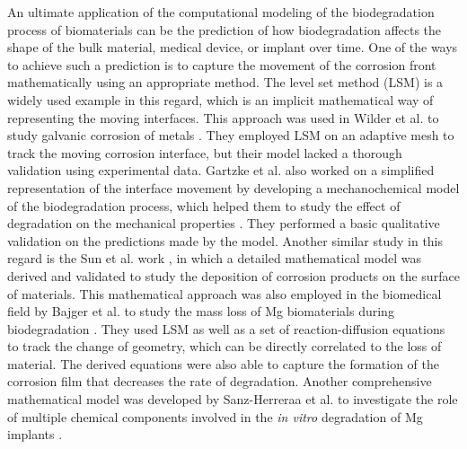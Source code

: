 An ultimate application of the computational modeling of the biodegradation process of biomaterials can be the prediction of how biodegradation affects the shape of the bulk material, medical device, or implant over time. One of the ways to achieve such a prediction is to capture  the movement of the corrosion front mathematically using an appropriate method. The level set method (LSM) is a widely used example in this regard, which is an implicit mathematical way of representing the moving interfaces. This approach was used in Wilder et al. to study galvanic corrosion of metals \cite{Wilder2014}. They employed LSM on an adaptive mesh to track the moving corrosion interface, but  their model lacked a thorough validation using experimental data.
Gartzke et al. also worked on a simplified representation of the interface movement by developing a mechanochemical model of the biodegradation process, which helped them to study the effect of degradation on the mechanical properties \cite{Gartzke2020}. They performed a basic qualitative validation on the predictions made by the model.
Another similar study in this regard is the Sun et al. work \cite{Sun2012}, in which a detailed mathematical model was derived and validated to study the deposition of  corrosion products on the surface of materials.
This mathematical approach was also employed in the biomedical field by Bajger et al. to study the mass loss of Mg biomaterials during biodegradation \cite{Bajger2016}. They used LSM as well as a set of reaction-diffusion equations to track the change of geometry, which can be directly correlated to the loss of material. The derived equations were also able to capture the formation of the corrosion film that decreases the rate of degradation.
Another comprehensive mathematical model was developed by Sanz-Herreraa et al. to investigate the role of multiple chemical components involved in the \textit{in vitro} degradation of Mg implants \cite{Sanz-Herrera2018}.
